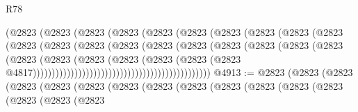 \begin{lexlean}{R78}
\begin{coremodule}
                                            (@2823
                                              (@2823
                                                (@2823
                                                  (@2823
                                                    (@2823
                                                      (@2823
                                                        (@2823
                                                          (@2823
                                                            (@2823
                                                              (@2823
                                                                (@2823
                                                                  (@2823
                                                                    (@2823
                                                                      (@2823
                                                                        (@2823
                                                                          (@2823
                                                                            (@2823
                                                                              (@2823
                                                                                (@2823
                                                                                  (@2823
                                                                                    (@2823
                                                                                      (@2823
                                                                                        (@2823
                                                                                          (@2823
                                                                                            (@2823
                                                                                              (@2823
                                                                                                (@2823
                                                                                                  @4817)))))))))))))))))))))))))))))))))))))))))))))))
@4913 := @2823
    (@2823
      (@2823
        (@2823
          (@2823
            (@2823
              (@2823
                (@2823
                  (@2823
                    (@2823
                      (@2823
                        (@2823
                          (@2823
                            (@2823
                              (@2823
                                (@2823

\end{coremodule}
\end{lexlean}
